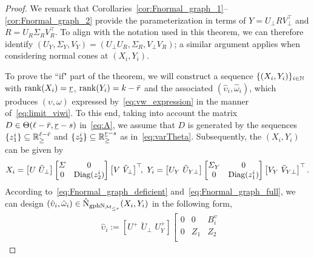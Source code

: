 \begin{proof}
    We remark that Corollaries~\ref{cor:Fnormal_graph_1}–\ref{cor:Fnormal_graph_2} provide the parameterization in terms of $Y = U_\bot R V_\bot^\top$ and $R = U_R \varSigma_R V_R^\top$. To align with the notation used in this theorem, we can therefore identify $(U_Y, \varSigma_Y, V_Y) = (U_\bot U_R, \varSigma_R, V_\bot V_R)$; a similar argument applies when considering normal cones at $(X_i,Y_i)$.

    To prove the ``if" part of the theorem, we will construct a sequence $\{(X_i,Y_i)\}_{i\in\mathbb{N}}$ with $\operatorname{rank}(X_i)={\underline{r}}$, $\operatorname{rank}(Y_i)=k-\bar{r}$ and the associated $(\hat{\upsilon}_i,\hat{\omega}_i)$, which produces $(\upsilon,\omega)$ expressed by~\eqref{eq:vw_expression} in the manner of~\eqref{eq:limit_viwi}. To this end, taking into account the matrix $D\in\mathrm{\Theta}(\ell-\bar{r}, {\underline{r}}-s)$ in~\eqref{eq:A}, we assume that $D$ is generated by the sequences $\{z^i_1\}\subseteq\mathbb{R}_{\ge}^{\ell-\bar{r}}$ and $\{z^i_2\}\subseteq\mathbb{R}_{\ge}^{{\underline{r}}-s}$ as in~\eqref{eq:varTheta}. Subsequently, the $(X_i,Y_i)$ can be given by
    \begin{equation*}
        X_i=\left[ U\,\,\tilde{U}_{\bot} \right] \left[ \begin{matrix}
	\varSigma&		0\\
	0&		\Diag(z^i_2)\\
        \end{matrix} \right] \left[ V\,\,\tilde{V}_{\bot} \right] ^{\top}\!\!,\ 
        Y_i=\left[ U_Y\,\,\tilde{U}_{Y\bot} \right] \left[ \begin{matrix}
        	\varSigma _Y&		0\\
        	0&		\Diag (z^i_1)\\
        \end{matrix} \right] \left[ V_Y\,\,\tilde{V}_{Y\bot} \right] ^{\top}.
    \end{equation*}
    According to~\eqref{eq:Fnormal_graph_deficient} and~\eqref{eq:Fnormal_graph_full}, we can design $(\hat{\upsilon}_i,\hat{\omega}_i)\in\hat{\mathrm{N}}_{\mathrm{gph}\mathrm{N}_{\mathcal{M}_{\le r}}}(X_i,Y_i)$ in the following form,
    \begin{equation}\label{eq:viwi_expression}
        \begin{aligned}
        &\hat{\upsilon}_i :=\left[ U^+\,\,\breve{U}_\bot\,\,U_{Y}^{+} \right] \left[ 
        \begin{array}{ccc}
            0 & 0 & B_i^{\upsilon} \\
            0 & Z_1 & Z_2\\

\end{array}
\end{aligned}
\end{equation}
\end{proof}
